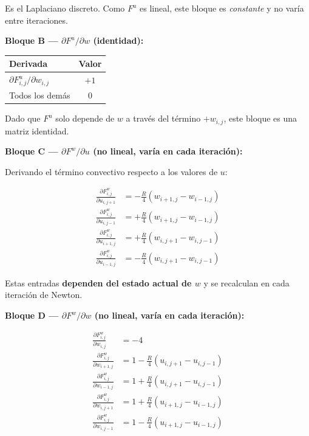 \documentclass[12pt, a4paper]{article}
\begin{document}
Es el Laplaciano discreto. Como $F^{u}$ es lineal, este bloque es
\emph{constante} y no varía entre iteraciones.

\bigskip
\noindent\textbf{Bloque B — $\partial F^{u}/\partial w$ (identidad):}

\begin{center}
\begin{tabular}{lc}
  \toprule
  \textbf{Derivada} & \textbf{Valor} \\
  \midrule
  $\partial F^{u}_{i,j}/\partial w_{i,j}$ & $+1$ \\
  Todos los demás                          & $0$  \\
  \bottomrule
\end{tabular}
\end{center}

Dado que $F^{u}$ solo depende de $w$ a través del término $+w_{i,j}$, este
bloque es una matriz identidad.

\bigskip
\noindent\textbf{Bloque C — $\partial F^{w}/\partial u$ (no lineal, varía en cada iteración):}

Derivando el término convectivo respecto a los valores de $u$:

\begin{align}
  \frac{\partial F^{w}_{i,j}}{\partial u_{i,j+1}} &= -\frac{R}{4}(w_{i+1,j} - w_{i-1,j}) \\[4pt]
  \frac{\partial F^{w}_{i,j}}{\partial u_{i,j-1}} &= +\frac{R}{4}(w_{i+1,j} - w_{i-1,j}) \\[4pt]
  \frac{\partial F^{w}_{i,j}}{\partial u_{i+1,j}} &= +\frac{R}{4}(w_{i,j+1} - w_{i,j-1}) \\[4pt]
  \frac{\partial F^{w}_{i,j}}{\partial u_{i-1,j}} &= -\frac{R}{4}(w_{i,j+1} - w_{i,j-1})
\end{align}

Estas entradas \textbf{dependen del estado actual de $w$} y se recalculan en
cada iteración de Newton.

\bigskip
\noindent\textbf{Bloque D — $\partial F^{w}/\partial w$ (no lineal, varía en cada iteración):}

\begin{align}
  \frac{\partial F^{w}_{i,j}}{\partial w_{i,j}}   &= -4 \\[4pt]
  \frac{\partial F^{w}_{i,j}}{\partial w_{i+1,j}} &= 1 - \frac{R}{4}(u_{i,j+1} - u_{i,j-1}) \\[4pt]
  \frac{\partial F^{w}_{i,j}}{\partial w_{i-1,j}} &= 1 + \frac{R}{4}(u_{i,j+1} - u_{i,j-1}) \\[4pt]
  \frac{\partial F^{w}_{i,j}}{\partial w_{i,j+1}} &= 1 + \frac{R}{4}(u_{i+1,j} - u_{i-1,j}) \\[4pt]
  \frac{\partial F^{w}_{i,j}}{\partial w_{i,j-1}} &= 1 - \frac{R}{4}(u_{i+1,j} - u_{i-1,j})
\end{align}
\end{document}
